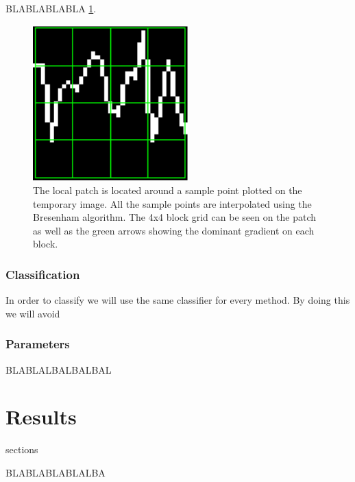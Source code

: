 \documentclass[sensors,article,submit,moreauthors,pdftex,10pt,a4paper]{mdpi}
\begin{document}
BLABLABLABLA \ref{fig:sampledescriptor}.
 
\begin{figure}[H]
\centering
\includegraphics[width=6cm]{sampledescriptor.png}
\caption{The local patch is located around a sample point plotted on the temporary image. All the sample points are interpolated using the Bresenham algorithm. The 4x4 block grid can be seen on the patch as well as the green arrows showing the dominant gradient on each block.}
\label{fig:sampledescriptor}
\end{figure}


\subsubsection{Classification}

In order to classify we will use the same classifier for every method.  By doing this we will avoid 


\subsubsection{Parameters}

BLABLALBALBALBAL

\section{Results}
\label{section:results}
sections

BLABLABLABLALBA
\end{document}
